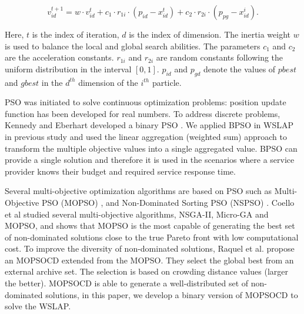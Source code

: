 \documentclass[10pt,journal,compsoc]{IEEEtran}
\begin{document}
\begin{equation}
\label{eq:updateVelocity}
 v^{t+1}_{id} = w \cdot v^{t}_{id} + c_1 \cdot r_{1i} \cdot (p_{id} - x^t_{id}) + c_2 \cdot r_{2i} \cdot (p_{pg} - x^i_{id}).
\end{equation}

Here, $t$ is the index of iteration, $d$ is the index of dimension. The inertia weight $w$ is used to balance the local and global search abilities. The parameters $c_1$ and $c_2$ are the acceleration constants. $r_{1i}$ and $r_{2i}$ are random constants following the uniform distribution in the interval $[0, 1]$. $p_{id}$ and $p_{gd}$ denote the values of $pbest$ and $gbest$ in the $d^{th}$ dimension of the $i^{th}$ particle.

PSO was initiated to solve continuous optimization problems: position update function has been developed for real numbers. 
To address discrete problems, Kennedy and Eberhart developed a binary PSO \cite{Kennedy:1997hd}. We applied BPSO in WSLAP in previous study \cite{Tan2016a} and used the linear aggregation (weighted sum) approach to transform the multiple objective values into a single aggregated value.
BPSO can provide a single solution and therefore it is used in the scenarios where a service provider knows their budget and required service response time. 

Several multi-objective optimization algorithms are based on PSO such as Multi-Objective PSO (MOPSO) \cite{1304847}, and Non-Dominated Sorting PSO (NSPSO) \cite{NSPSO}. Coello et al \cite{1304847} studied several multi-objective algorithms, NSGA-II, Micro-GA \cite{Micro} and MOPSO, and shows that MOPSO is the most capable of generating the best set of non-dominated solutions close to the true Pareto front with low computational cost. To improve the diversity of non-dominated solutions, Raquel et al. \cite{Raquel} propose an MOPSOCD extended from the MOPSO. They select the global best from an external archive set. The selection is based on crowding distance values (larger the better). MOPSOCD is able to generate a well-distributed set of non-dominated solutions, in this paper, we develop a binary version of MOPSOCD to solve the WSLAP.
\end{document}
